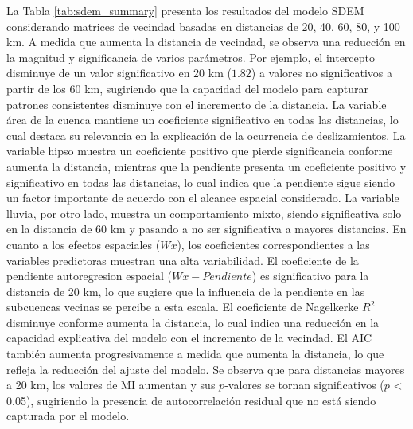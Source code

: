 \documentclass[
  manuscript=article,  
  layout=preprint,  
  year=2023,
  volume=0,
]{format}
\begin{document}
La Tabla \ref{tab:sdem_summary} presenta los resultados del modelo SDEM considerando matrices de vecindad basadas en distancias de 20, 40, 60, 80, y 100 km. A medida que aumenta la distancia de vecindad, se observa una reducción en la magnitud y significancia de varios parámetros. Por ejemplo, el intercepto disminuye de un valor significativo en 20 km ($1.82$) a valores no significativos a partir de los 60 km, sugiriendo que la capacidad del modelo para capturar patrones consistentes disminuye con el incremento de la distancia. La variable área de la cuenca mantiene un coeficiente significativo en todas las distancias, lo cual destaca su relevancia en la explicación de la ocurrencia de deslizamientos. La variable hipso muestra un coeficiente positivo que pierde significancia conforme aumenta la distancia, mientras que la pendiente presenta un coeficiente positivo y significativo en todas las distancias, lo cual indica que la pendiente sigue siendo un factor importante de acuerdo con el alcance espacial considerado. La variable lluvia, por otro lado, muestra un comportamiento mixto, siendo significativa solo en la distancia de 60 km y pasando a no ser significativa a mayores distancias. En cuanto a los efectos espaciales ($Wx$), los coeficientes correspondientes a las variables predictoras muestran una alta variabilidad. El coeficiente de la pendiente autoregresion espacial ($Wx-Pendiente$) es significativo para la distancia de 20 km, lo que sugiere que la influencia de la pendiente en las subcuencas vecinas se percibe a esta escala. El coeficiente de Nagelkerke $R^2$ disminuye conforme aumenta la distancia, lo cual indica una reducción en la capacidad explicativa del modelo con el incremento de la vecindad. El AIC también aumenta progresivamente a medida que aumenta la distancia, lo que refleja la reducción del ajuste del modelo. Se observa que para distancias mayores a 20 km, los valores de MI aumentan y sus $p$-valores se tornan significativos ($p$ < 0.05), sugiriendo la presencia de autocorrelación residual que no está siendo capturada por el modelo.
\end{document}

